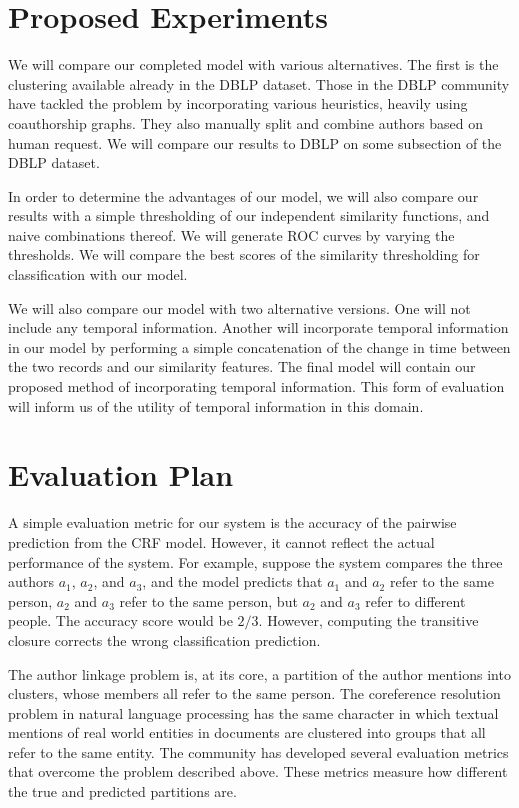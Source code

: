 \documentclass[twocolumn,letterpaper]{article}
\begin{document}
\section{Proposed Experiments} %
\label{sec:proposed_experiments}
We will compare our completed model with various alternatives. The first is the clustering available already in the DBLP dataset. Those in the DBLP community have tackled the problem by incorporating various heuristics, heavily using coauthorship graphs. They also manually split and combine authors based on human request. We will compare our results to DBLP on some subsection of the DBLP dataset. 

In order to determine the advantages of our model, we will also compare our results with a simple thresholding of our independent similarity functions, and naive combinations thereof. We will generate ROC curves by varying the thresholds. We will compare the best scores of the similarity thresholding for classification with our model.

We will also compare our model with two alternative versions. One will not include any temporal information. Another will incorporate temporal information in our model by performing a simple concatenation of the change in time between the two records and our similarity features. The final model will contain our proposed method of incorporating temporal information. This form of evaluation will inform us of the utility of temporal information in this domain.

\section{Evaluation Plan} %
\label{sec:evaluation}
A simple evaluation metric for our system is the accuracy
of the pairwise prediction from the CRF model.  However, it cannot
reflect the actual performance of the system.  For example, suppose
the system compares the three authors $a_1$, $a_2$, and $a_3$, and the
model predicts that $a_1$ and $a_2$ refer to the same person, $a_2$
and $a_3$ refer to the same person, but $a_2$ and $a_3$ refer to
different people.  The accuracy score would be $2/3$.  However,
computing the transitive closure corrects the wrong classification
prediction.

The author linkage problem is, at its core, a partition of the author
mentions into clusters, whose members all refer to the same person.
The coreference resolution problem in natural language processing has
the same character in which textual mentions of real world entities in
documents are clustered into groups that all refer to the same entity.
The community has developed several evaluation metrics that overcome
the problem described above.  These metrics measure how different the
true and predicted partitions are.
\end{document}
